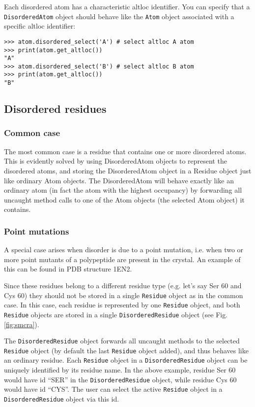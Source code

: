 Each disordered atom has a characteristic altloc identifier. You can
specify that a \texttt{Disordered\-Atom} object should behave like
the \texttt{Atom} object associated with a specific altloc identifier:

\begin{verbatim}
>>> atom.disordered_select('A') # select altloc A atom
>>> print(atom.get_altloc())
"A"
>>> atom.disordered_select('B') # select altloc B atom
>>> print(atom.get_altloc())
"B"
\end{verbatim}

\subsection{Disordered residues}

\subsubsection*{Common case}

The most common case is a residue that contains one or more disordered atoms.
This is evidently solved by using DisorderedAtom objects to represent the disordered
atoms, and storing the DisorderedAtom object in a Residue object just like ordinary
Atom objects. The DisorderedAtom will behave exactly like an ordinary atom (in
fact the atom with the highest occupancy) by forwarding all uncaught method
calls to one of the Atom objects (the selected Atom object) it contains.

\subsubsection*{Point mutations\label{point mutations}}

A special case arises when disorder is due to a point mutation, i.e. when two
or more point mutants of a polypeptide are present in the crystal. An example
of this can be found in PDB structure 1EN2.

Since these residues belong to a different residue type (e.g. let's
say Ser 60 and Cys 60) they should not be stored in a single \texttt{Residue}
object as in the common case. In this case, each residue is represented
by one \texttt{Residue} object, and both \texttt{Residue} objects
are stored in a single \texttt{Disordered\-Residue} object (see Fig.
\ref{fig:smcra}).

The \texttt{Dis\-ordered\-Residue} object forwards all un\-caught methods to
the selected \texttt{Residue} object (by default the last \texttt{Residue}
object added), and thus behaves like an ordinary residue. Each
\texttt{Residue} object in a \texttt{Disordered\-Residue} object can be
uniquely identified by its residue name. In the above example, residue Ser 60
would have id ``SER'' in the \texttt{Disordered\-Residue} object, while
residue Cys 60 would have id ``CYS''. The user can select the active
\texttt{Residue} object in a \texttt{Disordered\-Residue} object via this id.

